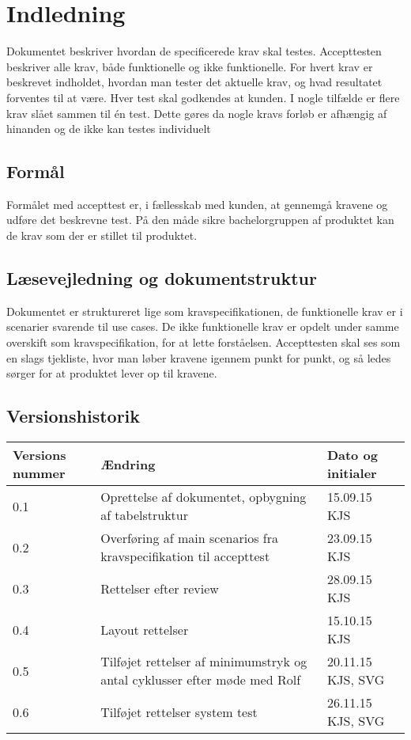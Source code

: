 	\chapter{Indledning}
	Dokumentet beskriver hvordan de specificerede krav skal testes. Accepttesten beskriver alle krav, både funktionelle og ikke funktionelle. For hvert krav er beskrevet indholdet, hvordan man tester det aktuelle krav, og hvad resultatet forventes til at være. Hver test skal godkendes at kunden. 
	I nogle tilfælde er flere krav slået sammen til én test. Dette gøres da nogle kravs forløb er afhængig af hinanden og de ikke kan testes individuelt 
	
	\section{Formål}
	Formålet med accepttest er, i fællesskab med kunden, at gennemgå kravene og udføre det beskrevne test. På den måde sikre bachelorgruppen af produktet kan de krav som der er stillet til produktet. 
	
	\section{Læsevejledning og dokumentstruktur}
	Dokumentet er struktureret lige som kravspecifikationen, de funktionelle krav er i scenarier svarende til use cases. De ikke funktionelle krav er opdelt under samme overskift som kravspecifikation, for at lette forståelsen. 
	Accepttesten skal ses som en slags tjekliste, hvor man løber kravene igennem punkt for punkt, og så ledes sørger for at produktet lever op til kravene. 
	
	\section{Versionshistorik}
		\begin{longtable}{ |p{} |p{}| p{}|  } 
			\hline
			\rowcolor{usDef}
			\textbf{Versions nummer} &  \textbf{Ændring} & \textbf{Dato og initialer} \\
			\hline
			0.1 & Oprettelse af dokumentet, opbygning af tabelstruktur  & 15.09.15 KJS \\
			\hline
			0.2 & Overføring af main scenarios fra kravspecifikation til accepttest  & 23.09.15 KJS \\
			\hline
			0.3 & Rettelser efter review & 28.09.15 KJS \\
			\hline
			0.4 & Layout rettelser & 15.10.15 KJS \\
			\hline
			0.5 & Tilføjet rettelser af minimumstryk og antal cyklusser efter møde med Rolf & 20.11.15 KJS, SVG \\
			\hline
			0.6 & Tilføjet rettelser system test & 26.11.15 KJS, SVG \\
			\hline
			
		\end{longtable}
	
